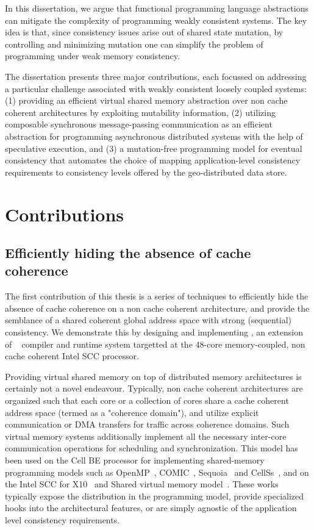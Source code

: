 In this dissertation, we argue that functional programming language
abstractions can mitigate the complexity of programming weakly consistent
systems. The key idea is that, since consistency issues arise out of shared
state mutation, by controlling and minimizing mutation one can simplify the
problem of programming under weak memory consistency.

The dissertation presents three major contributions, each focussed on
addressing a particular challenge associated with weakly consistent loosely
coupled systems: (1) providing an efficient virtual shared memory abstraction
over non cache coherent architectures by exploiting mutability information, (2)
utilizing composable synchronous message-passing communication as an efficient
abstraction for programming asynchronous distributed systems with the help of
speculative execution, and (3) a mutation-free programming model for eventual
consistency that automates the choice of mapping application-level consistency
requirements to consistency levels offered by the geo-distributed data store.

\section{Contributions}

\subsection{Efficiently hiding the absence of cache coherence}

The first contribution of this thesis is a series of techniques to efficiently
hide the absence of cache coherence on a non cache coherent architecture, and
provide the semblance of a shared coherent global address space with strong
(sequential) consistency. We demonstrate this by designing and implementing
\MMSCC, an extension of \MM~\cite{JFP14} compiler and runtime system targetted
at the 48-core memory-coupled, non cache coherent Intel SCC processor.

Providing virtual shared memory on top of distributed memory architectures is
certainly not a novel endeavour. Typically, non cache coherent architectures
are organized such that each core or a collection of cores share a cache
coherent address space (termed as a "coherence domain"), and utilize explicit
communication or DMA transfers for traffic across coherence domains. Such
virtual memory systems additionally implement all the necessary inter-core
communication operations for scheduling and synchronization. This model has
been used on the Cell BE processor for implementing shared-memory programming
models such as OpenMP~\cite{OBrien2008}, COMIC~\cite{Lee2008},
Sequoia~\cite{Houston2008} and CellSs~\cite{Bellens2006}, and on the Intel SCC
for X10~\cite{Chapman2011} and Shared virtual memory model~\cite{Lankes2012}.
These works typically expose the distribution in the programming model, provide
specialized hooks into the architectural features, or are simply agnostic of
the application level consistency requirements.

